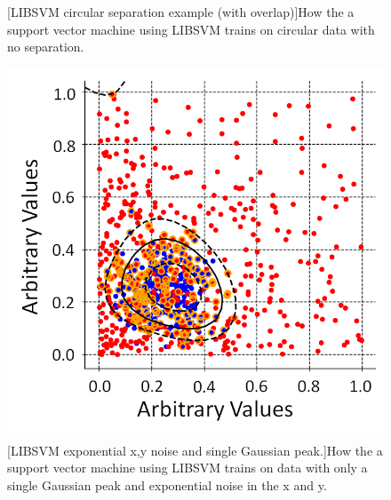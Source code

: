 \begin{figure}[!h]
\begin{minipage}{.45\textwidth}
  [LIBSVM circular separation example (with overlap)]{How the a support vector machine using LIBSVM trains on circular data with no separation.}
  \label{fig:CircleNoSepExample}
\end{minipage}
\end{figure}

\begin{figure}[!h]
 \centering
 \includegraphics[width=0.5\linewidth]{Chapter4/Figs/adjustedSvmPlots/adjusted_exp_1GausseExample.png}
 [LIBSVM  exponential x,y noise and single Gaussian peak.]{How the a support vector machine using LIBSVM trains on data with only a single Gaussian peak and exponential noise in the x and y.} 
 \label{fig:exp_1GausseExample}
\end{figure}

